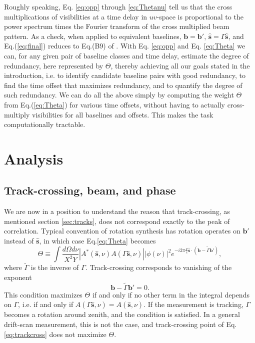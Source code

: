 \documentclass[twocolumn,apj,numberedappendix]{emulateapj}
\renewcommand\[{\begin{equation}}
\renewcommand\]{\end{equation}}
\begin{document}
Roughly speaking, Eq. \ref{eq:opp} through \ref{eq:Thetanu} tell us that the cross multiplications of visibilities at a time delay
in $uv$-space is proportional to the power spectrum times the Fourier
transform of the cross multiplied beam pattern. As a check, when applied to equivalent baselines,
$\boldsymbol{b}=\boldsymbol{b'}$, $\hat{\boldsymbol{s}}=\Gamma\hat{\boldsymbol{s}}$, and Eq.(\ref{eq:final}) reduces to Eq.(B9) of \cite{paper32}. 
With Eq. \ref{eq:opp} and Eq. \ref{eq:Theta} we can, for any given pair of baseline classes and time delay, estimate the degree of redundancy, here represented by $\Theta$, thereby achieving all our goals stated in the introduction, i.e. to identify 
candidate baseline pairs with good redundancy, to find the time offset that maximizes redundancy, and to quantify the degree of such redundancy. We can do all the above simply by computing the weight $\Theta$ from
Eq.(\ref{eq:Theta}) for various time offsets, without having to actually cross-multiply visibilities for all baselines and offsets. This makes the task computationally tractable. 

\section{Analysis}

\subsection{Track-crossing, beam, and phase}
We are now in a position to understand the reason that track-crossing, as mentioned section \ref{sec:tracks}, does not correspond exactly to the peak of correlation. Typical convention of rotation synthesis has rotation operates on $\boldsymbol{b'}$ instead of $\hat{\boldsymbol{s}}$, in which case Eq.\ref{eq:Theta} becomes
\begin{equation}
\Theta \equiv\int\frac{d\Omega d\nu}{X^{2}Y}|A^{*}(\hat{\boldsymbol{s}},\nu)A(\Gamma\hat{\boldsymbol{s}},\nu)||\phi(\nu)|^{2} e^{-i2\pi\frac{\nu}{c}\hat{\boldsymbol{s}}\cdot\left(\boldsymbol{b}-\widetilde{\Gamma}\boldsymbol{b'}\right)}, 
\end{equation}
where $\widetilde{\Gamma}$ is the inverse of $\Gamma$. Track-crossing corresponds to vanishing of the exponent
\[
 \boldsymbol{b}-\widetilde{\Gamma}\boldsymbol{b'} = 0. \label{eq:trackcross}
 \]
This condition maximizes $\Theta$ if and only if no other term in the integral depends on $\Gamma$, i.e. if and only if $A(\Gamma\hat{\boldsymbol{s}},\nu)=A(\hat{\boldsymbol{s}},\nu)$. If the measurement is tracking, $\Gamma$ becomes a rotation around zenith, and the condition is satisfied. In a general drift-scan measurement, this is not the case, and track-crossing point of Eq. \ref{eq:trackcross} does not maximize $\Theta$. 
\end{document}
